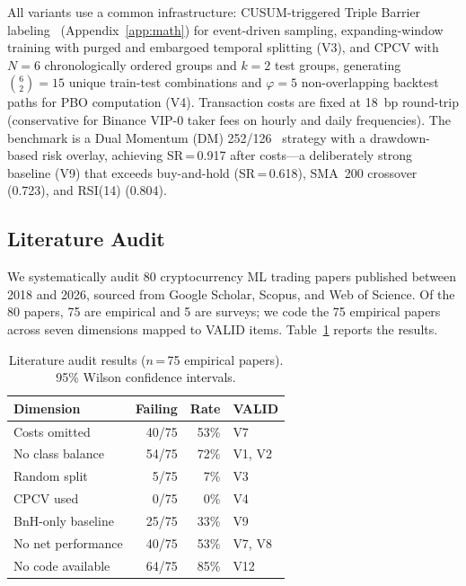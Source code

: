 \documentclass[sigconf,anonymous,review]{acmart}
\begin{document}
All variants use a common infrastructure:
CUSUM-triggered Triple Barrier
labeling~\cite{lopezdeprado2018advances} (Appendix~\ref{app:math})
for event-driven sampling,
expanding-window training with purged and embargoed temporal
splitting (V3), and CPCV with $N=6$ chronologically ordered groups and $k=2$
test groups, generating $\binom{6}{2} = 15$ unique train-test
combinations and $\varphi = 5$ non-overlapping backtest paths
for PBO computation (V4). Transaction costs are fixed at 18~bp round-trip
(conservative for Binance VIP-0 taker fees on hourly and daily
frequencies). The benchmark is a Dual Momentum (DM)
252/126~\cite{antonacci2014dual} strategy with a drawdown-based risk overlay, achieving SR\,=\,0.917 after
costs---a deliberately strong baseline (V9) that exceeds buy-and-hold (SR\,=\,0.618), SMA~200
crossover (0.723), and RSI(14) (0.804).

\subsection{Literature Audit}
\label{sec:audit}

We systematically audit 80 cryptocurrency ML trading papers published
between 2018 and 2026, sourced from Google Scholar, Scopus, and Web of
Science. Of the 80 papers, 75 are empirical and 5 are surveys; we code
the 75 empirical papers across seven dimensions mapped to VALID items.
Table~\ref{tab:audit} reports the results.

\begin{table}[t]
\centering
\caption{Literature audit results ($n$\,=\,75 empirical papers). 95\%
Wilson confidence intervals.}
\label{tab:audit}
\small
\begin{tabular}{lrrl}
\toprule
Dimension & Failing & Rate & VALID \\
\midrule
Costs omitted & 40/75 & 53\% & V7 \\
No class balance & 54/75 & 72\% & V1, V2 \\
Random split & 5/75 & 7\% & V3 \\
CPCV used & 0/75 & 0\% & V4 \\
BnH-only baseline & 25/75 & 33\% & V9 \\
No net performance & 40/75 & 53\% & V7, V8 \\
No code available & 64/75 & 85\% & V12 \\
\bottomrule
\end{tabular}
\end{table}
\end{document}
